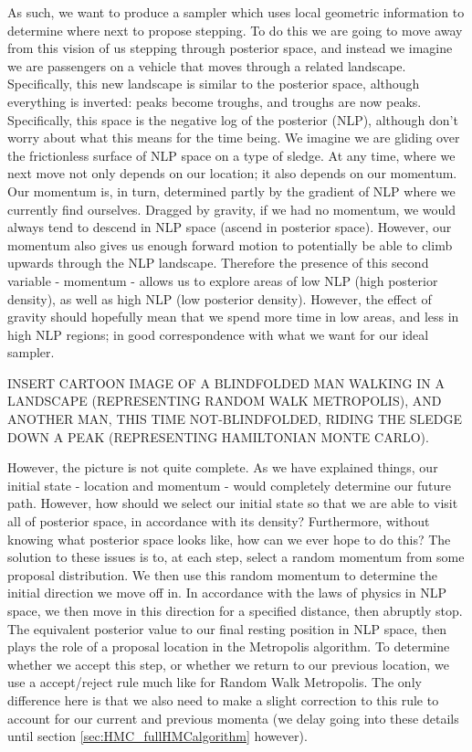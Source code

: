 \documentclass[11pt,fullpage]{book}
\begin{document}
As such, we want to produce a sampler which uses local geometric information to determine where next to propose stepping. To do this we are going to move away from this vision of us stepping through posterior space, and instead we imagine we are passengers on a vehicle that moves through a related landscape. Specifically, this new landscape is similar to the posterior space, although everything is inverted: peaks become troughs, and troughs are now peaks. Specifically, this space is the negative log of the posterior (NLP), although don't worry about what this means for the time being. We imagine we are gliding over the frictionless surface of NLP space on a type of sledge. At any time, where we next move not only depends on our location; it also depends on our momentum. Our momentum is, in turn, determined partly by the gradient of NLP where we currently find ourselves. Dragged by gravity, if we had no momentum, we would always tend to descend in NLP space (ascend in posterior space). However, our momentum also gives us enough forward motion to potentially be able to climb upwards through the NLP landscape. Therefore the presence of this second variable - momentum - allows us to explore areas of low NLP (high posterior density), as well as high NLP (low posterior density). However, the effect of gravity should hopefully mean that we spend more time in low areas, and less in high NLP regions; in good correspondence with what we want for our ideal sampler.

INSERT CARTOON IMAGE OF A BLINDFOLDED MAN WALKING IN A LANDSCAPE (REPRESENTING RANDOM WALK METROPOLIS), AND ANOTHER MAN, THIS TIME NOT-BLINDFOLDED, RIDING THE SLEDGE DOWN A PEAK (REPRESENTING HAMILTONIAN MONTE CARLO).

However, the picture is not quite complete. As we have explained things, our initial state - location and momentum - would completely determine our future path. However, how should we select our initial state so that we are able to visit all of posterior space, in accordance with its density? Furthermore, without knowing what posterior space looks like, how can we ever hope to do this? The solution to these issues is to, at each step, select a random momentum from some proposal distribution. We then use this random momentum to determine the initial direction we move off in. In accordance with the laws of physics in NLP space, we then move in this direction for a specified distance, then abruptly stop. The equivalent posterior value to our final resting position in NLP space, then plays the role of a proposal location in the Metropolis algorithm. To determine whether we accept this step, or whether we return to our previous location, we use a accept/reject rule much like for Random Walk Metropolis. The only difference here is that we also need to make a slight correction to this rule to account for our current and previous momenta (we delay going into these details until section \ref{sec:HMC_fullHMCalgorithm} however).
\end{document}
